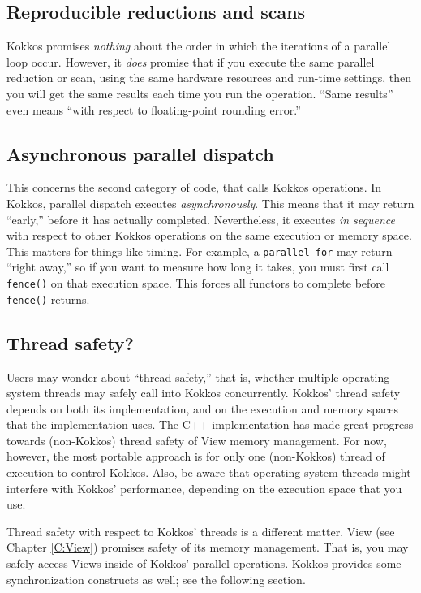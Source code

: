 \subsection{Reproducible reductions and scans}\label{SS:Model:Exec:Repro}

Kokkos promises \emph{nothing} about the order in which the iterations of a parallel loop occur.
However, it \emph{does} promise that if you execute the same parallel reduction or scan,
using the same hardware resources and run-time settings,
then you will get the same results each time you run the operation.
``Same results'' even means ``with respect to floating-point rounding error.''

\subsection{Asynchronous parallel dispatch}\label{SS:Model:Exec:Async}

This concerns the second category of code, that calls Kokkos operations.
In Kokkos, parallel dispatch executes \emph{asynchronously}.  
This means that it may return ``early,'' before it has actually completed.
Nevertheless, it executes \emph{in sequence} with respect to other Kokkos operations on the same execution or memory space.
This matters for things like timing.
For example, a \lstinline!parallel_for! may return ``right away,''
so if you want to measure how long it takes,
you must first call \lstinline!fence()! on that execution space.
This forces all functors to complete before \lstinline!fence()! returns.

\subsection{Thread safety?}\label{SS:Model:Exec:ThreadSafety}

Users may wonder about ``thread safety,'' that is,
whether multiple operating system threads may safely call into Kokkos concurrently.
Kokkos' thread safety depends on both its implementation, 
and on the execution and memory spaces that the implementation uses.
The C++ implementation has made great progress towards (non-Kokkos) thread safety of View memory management.
For now, however, the most portable approach is for only one (non-Kokkos) thread of execution to control Kokkos.
Also, be aware that operating system threads might interfere with Kokkos' performance,
depending on the execution space that you use.

Thread safety with respect to Kokkos' threads is a different matter.
View (see Chapter \ref{C:View}) promises safety of its memory management.
That is, you may safely access Views inside of Kokkos' parallel operations.
Kokkos provides some synchronization constructs as well; see the following section.

